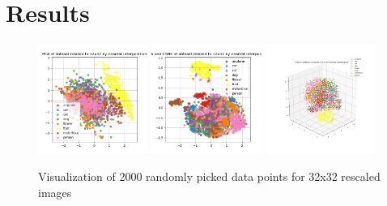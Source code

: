 \documentclass{article}
\begin{document}
\section{Results}

\begin{figure}[!htb]
	\begin{center}
		\includegraphics[width=0.32\textwidth]{./figures/pca_h32_w32_r_none.png}
		\includegraphics[width= 0.32\textwidth]{./figures/pca_tsne_h32_w32_r_none.png}
		\includegraphics[width= 0.32\textwidth]{./figures/tsne_h32_w32_r_none.png}
		\caption{Visualization of 2000 randomly picked data points for 32x32 rescaled images}
	\end{center}
\end{figure}
\end{document}
